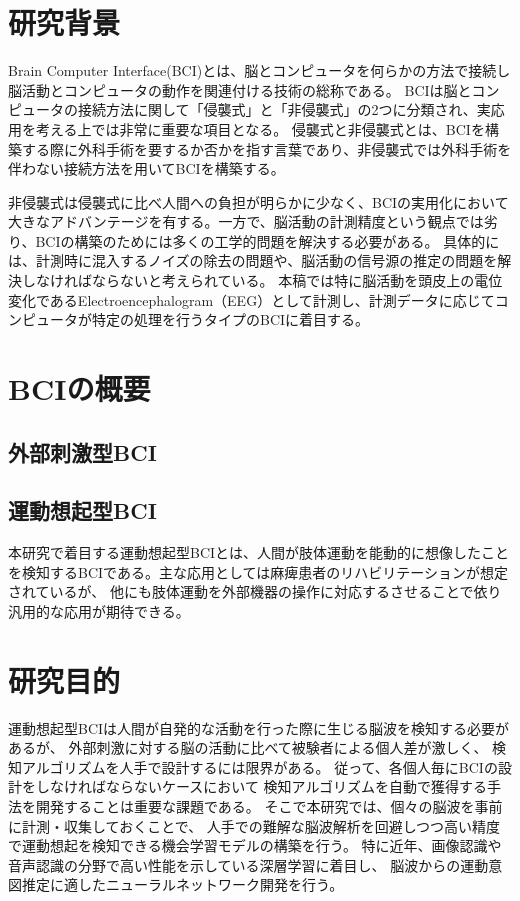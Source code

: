\section{研究背景}

Brain Computer Interface(BCI)とは、脳とコンピュータを何らかの方法で接続し脳活動とコンピュータの動作を関連付ける技術の総称である。
BCIは脳とコンピュータの接続方法に関して「侵襲式」と「非侵襲式」の2つに分類され、実応用を考える上では非常に重要な項目となる。
侵襲式と非侵襲式とは、BCIを構築する際に外科手術を要するか否かを指す言葉であり、非侵襲式では外科手術を伴わない接続方法を用いてBCIを構築する。

非侵襲式は侵襲式に比べ人間への負担が明らかに少なく、BCIの実用化において大きなアドバンテージを有する。一方で、脳活動の計測精度という観点では劣り、BCIの構築のためには多くの工学的問題を解決する必要がある。
具体的には、計測時に混入するノイズの除去の問題や、脳活動の信号源の推定の問題を解決しなければならないと考えられている。
本稿では特に脳活動を頭皮上の電位変化であるElectroencephalogram（EEG）として計測し、計測データに応じてコンピュータが特定の処理を行うタイプのBCIに着目する。


\section{BCIの概要}
\subsection{外部刺激型BCI}
\subsection{運動想起型BCI}
本研究で着目する運動想起型BCIとは、人間が肢体運動を能動的に想像したことを検知するBCIである。主な応用としては麻痺患者のリハビリテーションが想定されているが、
他にも肢体運動を外部機器の操作に対応するさせることで依り汎用的な応用が期待できる。

\section{研究目的}
運動想起型BCIは人間が自発的な活動を行った際に生じる脳波を検知する必要があるが、
外部刺激に対する脳の活動に比べて被験者による個人差が激しく、
検知アルゴリズムを人手で設計するには限界がある。
従って、各個人毎にBCIの設計をしなければならないケースにおいて
検知アルゴリズムを自動で獲得する手法を開発することは重要な課題である。
そこで本研究では、個々の脳波を事前に計測・収集しておくことで、
人手での難解な脳波解析を回避しつつ高い精度で運動想起を検知できる機会学習モデルの構築を行う。
特に近年、画像認識や音声認識の分野で高い性能を示している深層学習に着目し、
脳波からの運動意図推定に適したニューラルネットワーク開発を行う。